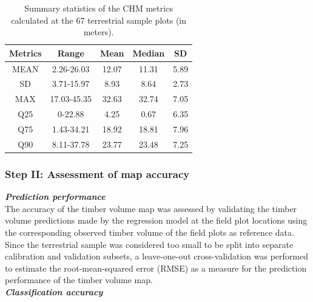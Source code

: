 
\begin{table}[H]
	\begin{center}
		\caption{Summary  statistics  of  the  CHM  metrics  calculated  at  the  67  terrestrial sample plots (in meters).}
		\vspace{0.2cm}
		\label{tab:sumCHMmetr}
		{\small %
			\begin{tabular}{|c|c|c|c|c|} %
				\hlineB{1}
				Metrics & Range & Mean & Median & SD \\
				\hline \hline
				MEAN & 2.26-26.03 & 12.07 & 11.31 & 5.89 \\
				SD & 3.71-15.97 & 8.93 & 8.64 & 2.73 \\
				MAX & 17.03-45.35 & 32.63 &	32.74 &	7.05 \\
				Q25	& 0-22.88 &	4.25 & 0.67 & 6.35 \\
				Q75	& 1.43-34.21 & 18.92 & 18.81 & 7.96 \\
				Q90	& 8.11-37.78 & 23.77 & 23.48 & 7.25 \\
				\hline \hline
			\end{tabular}
		}%
	\end{center}
\end{table}





\subsubsection{Step II: Assessment of map accuracy}
\label{sec:step2}

\textit{\textbf{Prediction performance}}\\

The accuracy of the timber volume map was assessed by validating the timber volume predictions made by the regression model at the field plot locations using the corresponding observed timber volume of the field plots as reference data. Since the terrestrial sample was considered too small to be split into separate calibration and validation subsets, a leave-one-out cross-validation was performed to estimate the root-mean-squared error (RMSE) as a measure for the prediction performance of the timber volume map.\\

\textit{\textbf{Classification accuracy}}\\

